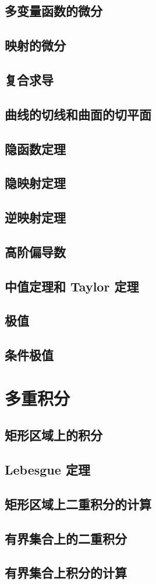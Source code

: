 \documentclass[a4paper, 11pt]{ctexbook}
\begin{document}
        \section{多变量函数的微分}
            
        \section{映射的微分}
            
        \section{复合求导}
        \section{曲线的切线和曲面的切平面}
        \section{隐函数定理}
        \section{隐映射定理}
        \section{逆映射定理}
        \section{高阶偏导数}
        \section{中值定理和 Taylor 定理}
        \section{极值}
        \section{条件极值}
    \chapter{多重积分}
        \section{矩形区域上的积分}
        \section{Lebesgue 定理}
            
        \section{矩形区域上二重积分的计算}
            
        \section{有界集合上的二重积分}
            
        \section{有界集合上积分的计算}
            
\end{document}
